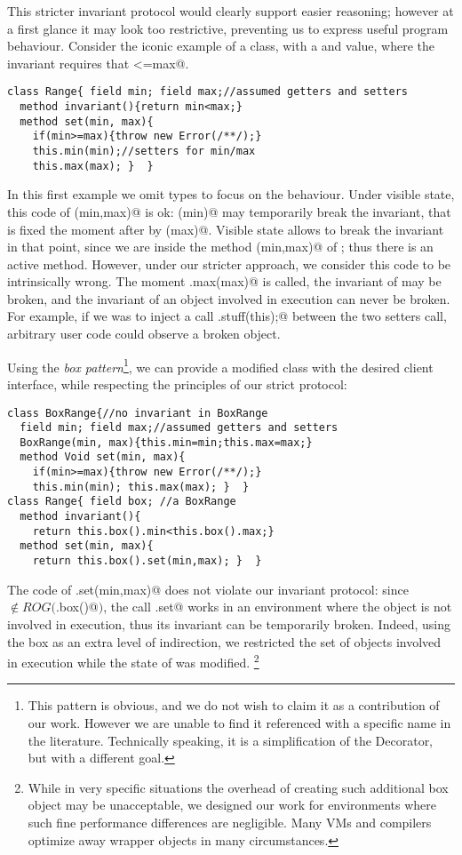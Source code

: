 This stricter invariant protocol would clearly support easier reasoning; however 
at a first glance it may look too restrictive, preventing us to express useful program behaviour.
Consider the iconic example of a \Q@Range@ class, with a \Q@min@ and \Q@max@
value, where the invariant requires that \Q@min<=max@.
\begin{lstlisting}
class Range{ field min; field max;//assumed getters and setters
  method invariant(){return min<max;}
  method set(min, max){
    if(min>=max){throw new Error(/**/);}
    this.min(min);//setters for min/max
    this.max(max); }  }
\end{lstlisting}
In this first example we omit types to focus on the behaviour.
Under visible state, this code of \Q@set(min,max)@ is ok:
\Q@min(min)@ may temporarily break the invariant, that is fixed the moment
after by \Q@max(max)@. Visible state allows to break the invariant in that point, since
we are inside the method \Q@set(min,max)@ of \Q@Range@; thus there is an active method.
However, under our stricter approach, we consider this code to be intrinsically wrong. The moment
\Q@this.max(max)@ is called, the invariant of \Q@this@ may be broken, and
the invariant of an object involved in execution can never be broken. For example, if we was to inject a call
\Q@Do.stuff(this);@ between the two setters call,
arbitrary user code could observe a broken object.

Using the \emph{box pattern}\footnote{
This pattern is obvious, and we do not wish to claim it as a contribution of our work.
However we are unable to find it referenced with a specific name in the literature. Technically speaking, it is a simplification of the Decorator, but with a different goal.}, we can provide a modified
\Q@Range@ class with the desired client interface, while respecting the principles of our strict protocol:
\begin{lstlisting}
class BoxRange{//no invariant in BoxRange
  field min; field max;//assumed getters and setters
  BoxRange(min, max){this.min=min;this.max=max;}
  method Void set(min, max){
    if(min>=max){throw new Error(/**/);}
    this.min(min); this.max(max); }  }
class Range{ field box; //a BoxRange
  method invariant(){
    return this.box().min<this.box().max;}
  method set(min, max){
    return this.box().set(min,max); }  }
\end{lstlisting}
The code of \Q@Range.set(min,max)@ does not violate our invariant protocol:
  since \Q@this@ $\notin \mathit{ROG}($\Q@this.box()@$)$, the call
\Q@BoxRange.set@ works in an environment where the \Q@Range@ object is
not involved in execution, thus its invariant can be temporarily broken.
Indeed, using the box as an extra level of indirection, we restricted the set of objects involved in execution while the state of \Q@Range@ was modified.
\footnote{While in very specific situations the overhead of creating such additional box object may be unacceptable, 
we designed our work for environments where such fine performance differences are negligible.
Many VMs and compilers optimize away wrapper objects in many circumstances.\cite{help}}


